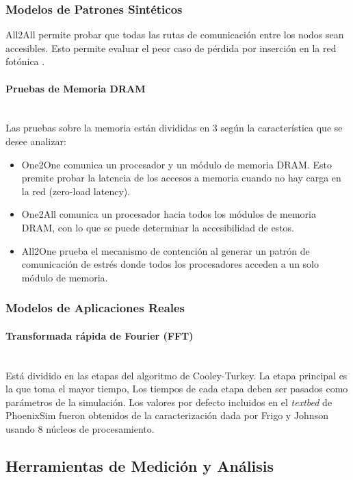 \subsubsection{Modelos de Patrones Sintéticos}
All2All permite probar que todas las rutas de comunicación entre los nodos sean accesibles. Esto permite evaluar el peor caso de pérdida por inserción en la red fotónica \cite{Manual}.


\paragraph{Pruebas de Memoria DRAM}~\\
Las pruebas sobre la memoria están divididas en 3 según la característica que se desee analizar: 
\begin{itemize}
\item One2One comunica un procesador y un módulo de memoria DRAM. Esto premite probar la latencia de los accesos a memoria cuando no hay carga en la red (zero-load latency).
\item One2All comunica un procesador hacia todos los módulos de memoria DRAM, con lo que se puede determinar la accesibilidad de estos.
\item All2One prueba el mecanismo de contención al generar un patrón de comunicación de estrés donde todos los procesadores acceden a un solo módulo de memoria.
\end{itemize} 

\subsubsection{Modelos de Aplicaciones Reales}
\paragraph{Transformada rápida de Fourier (FFT)}~\\

Está dividido en las etapas del algoritmo de Cooley-Turkey. La etapa principal es la que toma el mayor tiempo, 
Los tiempos de cada etapa deben ser pasados como parámetros de la simulación. Los valores por defecto incluidos en el \textit{textbed} de PhoenixSim fueron obtenidos de la caracterización  dada por Frigo y Johnson \cite{benchFFT} usando 8 núcleos de procesamiento. 

\subsection{Herramientas de Medición y Análisis}

